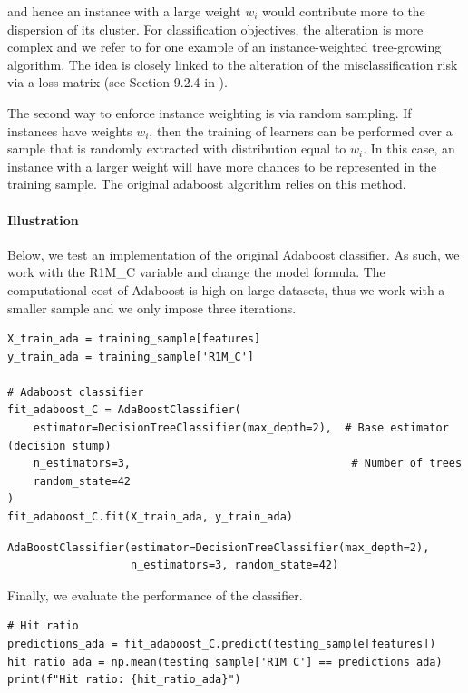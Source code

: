 and hence an instance with a large weight $w_i$ would contribute more to the dispersion of its cluster. For classification objectives, the alteration is more complex and we refer to \cite{ting2002instance} for one example of an instance-weighted tree-growing algorithm. The idea is closely linked to the alteration of the misclassification risk via a loss matrix (see Section 9.2.4 in \cite{friedman2009elements}).

The second way to enforce instance weighting is via random sampling. If instances have weights $w_i$, then the training of learners can be performed over a sample that is randomly extracted with distribution equal to $w_i$. In this case, an instance with a larger weight will have more chances to be represented in the training sample. The original adaboost algorithm relies on this method.

\paragraph{Illustration}

Below, we test an implementation of the original Adaboost classifier. As such, we work with the R1M\_C variable and change the model formula. The computational cost of Adaboost is high on large datasets, thus we work with a smaller sample and we only impose three iterations.

\begin{verbatim}
X_train_ada = training_sample[features]
y_train_ada = training_sample['R1M_C']

# Adaboost classifier
fit_adaboost_C = AdaBoostClassifier(
    estimator=DecisionTreeClassifier(max_depth=2),  # Base estimator (decision stump)
    n_estimators=3,                                  # Number of trees
    random_state=42
)
fit_adaboost_C.fit(X_train_ada, y_train_ada)
\end{verbatim}

\begin{verbatim}
AdaBoostClassifier(estimator=DecisionTreeClassifier(max_depth=2),
                   n_estimators=3, random_state=42)
\end{verbatim}

Finally, we evaluate the performance of the classifier.

\begin{verbatim}
# Hit ratio
predictions_ada = fit_adaboost_C.predict(testing_sample[features])
hit_ratio_ada = np.mean(testing_sample['R1M_C'] == predictions_ada)
print(f"Hit ratio: {hit_ratio_ada}")
\end{verbatim}

